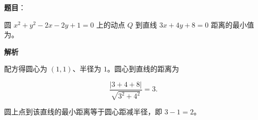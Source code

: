 \begin{answer}

\textbf{题目}：

圆 \(x^2+y^2-2x-2y+1=0\) 上的动点 \(Q\) 到直线 \(3x+4y+8=0\) 距离的最小值为\gkblank{}。

\textbf{解析}

配方得圆心为 $(1,1)$、半径为 $1$。圆心到直线的距离为

\nopagebreak[4]
\[\frac{|3+4+8|}{\sqrt{3^2+4^2}}=3.\]

圆上点到该直线的最小距离等于圆心距减半径，即 $3-1=2$。


\end{answer}

